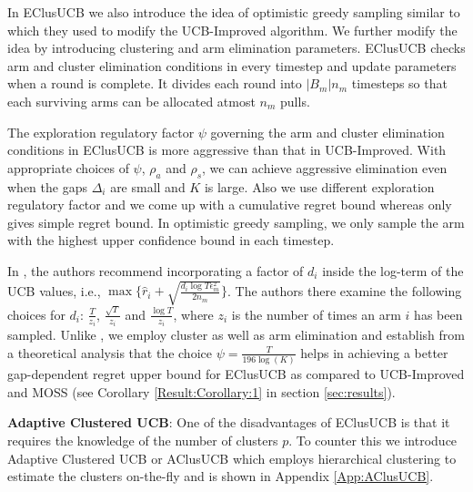 In EClusUCB we also introduce the idea of optimistic greedy sampling similar to \citet{liu2016modification} which they used to modify the UCB-Improved algorithm. We further modify the idea by introducing clustering and arm elimination parameters. EClusUCB checks arm and cluster elimination conditions in every timestep and update parameters when a round is complete. It divides each round into $|B_{m}|n_{m}$ timesteps so that each surviving arms can be allocated atmost $n_{m}$ pulls. 

The exploration regulatory factor $\psi$ governing the arm and cluster elimination conditions in EClusUCB is more aggressive than that in UCB-Improved. With appropriate choices of $\psi$, $\rho_a$ and $\rho_s$, we can achieve aggressive elimination even when the gaps $\Delta_i$ are small and $K$ is large. Also we use different exploration regulatory factor and we come up with a cumulative regret bound whereas \citet{liu2016modification} only gives simple regret bound. In optimistic greedy sampling, we only sample the arm with the highest upper confidence bound in each timestep. 



In \citet{liu2016modification}, the authors recommend incorporating a factor of $d_i$ inside the log-term of the UCB values, i.e., $\max \lbrace\hat{r}_{i}+\sqrt{\frac{d_{i}\log T{\epsilon}_{m}^{2}}{2n_{m}}}\rbrace$. 
The authors there examine the following choices for $d_i$: $\frac{T}{z_{i}}$, $\frac{\sqrt{T}}{z_{i}}$ and $\frac{\log T}{z_{i}}$, where $z_{i}$ is the number of times an arm ${i}$ has been sampled.
Unlike \citet{liu2016modification}, we employ cluster as well as arm elimination and establish from a theoretical analysis that the choice $\psi=\frac{T}{196\log (K)}$ helps in achieving a better gap-dependent regret upper bound for EClusUCB as compared to UCB-Improved and MOSS (see Corollary \ref{Result:Corollary:1} in section \ref{sec:results}). 

\textbf{Adaptive Clustered UCB}: One of the disadvantages of EClusUCB is that it requires the knowledge of the number of clusters $p$. To counter this we introduce Adaptive Clustered UCB or AClusUCB which employs hierarchical clustering to estimate the clusters on-the-fly and is shown in Appendix \ref{App:AClusUCB}.
